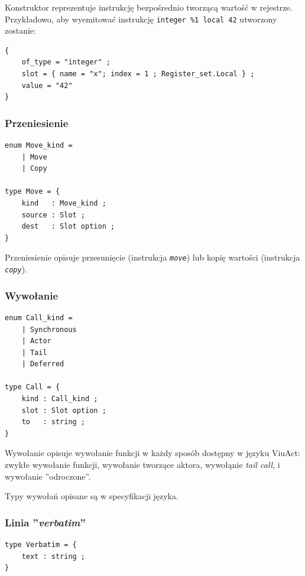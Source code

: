 \documentclass[11pt,oneside,a4paper,titlepage,onecolumn]{article}
\begin{document}
Konstruktor reprezentuje instrukcję bezpośrednio tworzącą wartość w rejestrze. Przykładowo, aby wyemitować
instrukcję \texttt{integer \%1 local 42} utworzony zostanie:

\begin{lstlisting}
{
    of_type = "integer" ;
    slot = { name = "x"; index = 1 ; Register_set.Local } ;
    value = "42"
}
\end{lstlisting}

\subsubsection{Przeniesienie}
\label{diagram_klas_przeniesienie}

\begin{lstlisting}
enum Move_kind =
    | Move
    | Copy

type Move = {
    kind   : Move_kind ;
    source : Slot ;
    dest   : Slot option ;
}
\end{lstlisting}

Przeniesienie opisuje przesunięcie (instrukcja \emph{\texttt{move}}) lub kopię wartości (instrukcja
\emph{\texttt{copy}}).

\subsubsection{Wywołanie}
\label{diagram_klas_wywolanie}

\begin{lstlisting}
enum Call_kind =
    | Synchronous
    | Actor
    | Tail
    | Deferred

type Call = {
    kind : Call_kind ;
    slot : Slot option ;
    to   : string ;
}
\end{lstlisting}

Wywołanie opisuje wywołanie funkcji w każdy sposób dostępny w języku ViuAct: zwykłe wywołanie funkcji,
wywołanie tworzące aktora, wywołąnie \emph{tail call}, i wywołanie ''odroczone''.

Typy wywołań opisane są w specyfikacji języka.

\subsubsection{Linia ''\emph{verbatim}''}
\label{diagram_klas_linia_verbatim}

\begin{lstlisting}
type Verbatim = {
    text : string ;
}
\end{lstlisting}
\end{document}
